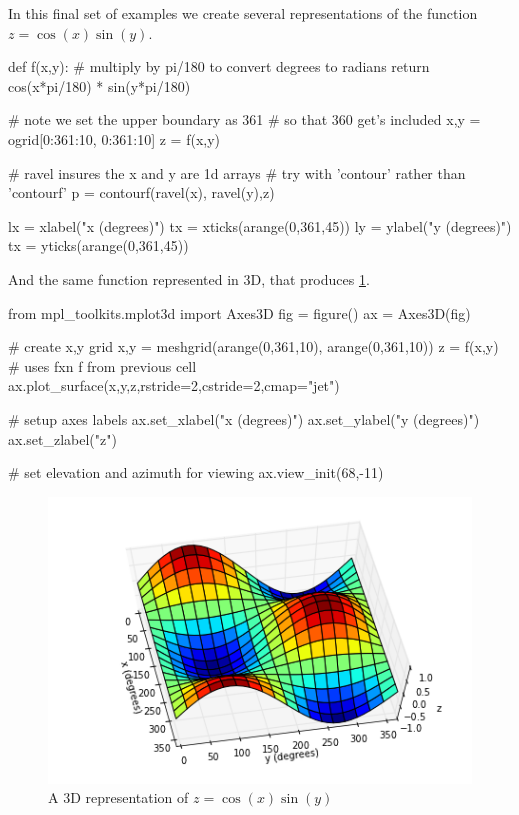 In this final set of examples we create several representations of the function $z = \cos(x) \sin(y)$.
%
\begin{python}
def f(x,y):
    # multiply by pi/180 to convert degrees to radians
    return cos(x*pi/180) * sin(y*pi/180)

# note we set the upper boundary as 361
# so that 360 get's included
x,y = ogrid[0:361:10, 0:361:10]
z = f(x,y)

# ravel insures the x and y are 1d arrays
# try with 'contour' rather than 'contourf'
p = contourf(ravel(x), ravel(y),z)

lx = xlabel("x (degrees)")
tx = xticks(arange(0,361,45))
ly = ylabel("y (degrees)")
tx = yticks(arange(0,361,45))
\end{python}
%
And the same function represented in 3D, that produces \cref{fig:3dplot}.
%
\begin{python}
from mpl_toolkits.mplot3d import Axes3D
fig = figure()
ax = Axes3D(fig)

# create x,y grid
x,y = meshgrid(arange(0,361,10), arange(0,361,10))
z = f(x,y) # uses fxn f from previous cell
ax.plot_surface(x,y,z,rstride=2,cstride=2,cmap="jet")

# setup axes labels
ax.set_xlabel("x (degrees)")
ax.set_ylabel("y (degrees)")
ax.set_zlabel("z")

# set elevation and azimuth for viewing
ax.view_init(68,-11) 
\end{python}
%
\begin{figure}[!ht]
    \centering
    \includegraphics[width=0.5\columnwidth]{./figures/hands-on8/fig-3dplot.png}
    \caption{A 3D representation of $z = \cos(x) \sin(y)$}\label{fig:3dplot}
\end{figure}



